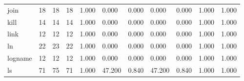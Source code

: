 \begin{longtable}{lp{1.2cm}p{1.2cm}p{1.2cm}p{1.2cm}p{1.2cm}p{1.2cm}p{1.2cm}p{1.2cm}p{1.2cm}p{1.2cm}}
join      &                           18 &                 18 &                                18 &                                      1.000 &                                  0.000 &                                        0.000 &                             0.000 &                                   0.000 &                              1.000 &                                              1.000 \\
kill      &                           14 &                 14 &                                14 &                                      1.000 &                                  0.000 &                                        0.000 &                             0.000 &                                   0.000 &                              1.000 &                                              1.000 \\
link      &                           12 &                 12 &                                12 &                                      1.000 &                                  0.000 &                                        0.000 &                             0.000 &                                   0.000 &                              1.000 &                                              1.000 \\
ln        &                           22 &                 23 &                                22 &                                      1.000 &                                  0.000 &                                        0.000 &                             0.000 &                                   0.000 &                              1.000 &                                              1.000 \\
logname   &                           12 &                 12 &                                12 &                                      1.000 &                                  0.000 &                                        0.000 &                             0.000 &                                   0.000 &                              1.000 &                                              1.000 \\
ls        &                           71 &                 75 &                                71 &                                      1.000 &                                 47.200 &                                        0.840 &                            47.200 &                                   0.840 &                              1.000 &                                              1.000 \\

\end{longtable}
